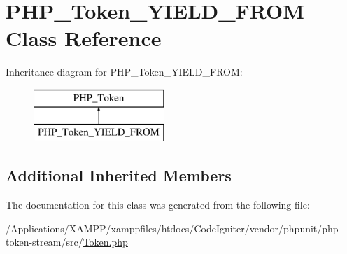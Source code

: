 \hypertarget{class_p_h_p___token___y_i_e_l_d___f_r_o_m}{}\section{P\+H\+P\+\_\+\+Token\+\_\+\+Y\+I\+E\+L\+D\+\_\+\+F\+R\+OM Class Reference}
\label{class_p_h_p___token___y_i_e_l_d___f_r_o_m}
Inheritance diagram for P\+H\+P\+\_\+\+Token\+\_\+\+Y\+I\+E\+L\+D\+\_\+\+F\+R\+OM\+:\begin{figure}[H]
\begin{center}
\leavevmode
\includegraphics[height=2.000000cm]{class_p_h_p___token___y_i_e_l_d___f_r_o_m}
\end{center}
\end{figure}
\subsection*{Additional Inherited Members}


The documentation for this class was generated from the following file\+:\begin{DoxyCompactItemize}
\item 
/\+Applications/\+X\+A\+M\+P\+P/xamppfiles/htdocs/\+Code\+Igniter/vendor/phpunit/php-\/token-\/stream/src/\mbox{\hyperlink{_token_8php}{Token.\+php}}\end{DoxyCompactItemize}

